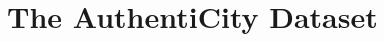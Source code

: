 \documentclass[sigconf,authordraft]{acmart}
\newcommand{\benchname}{\textit{Authenti\-City}}
\begin{document}
  

\section{The AuthentiCity Dataset}\label{sec:dataset}
\end{document}
